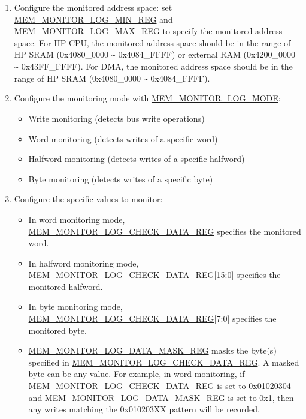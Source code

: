 \documentclass[main\_\_EN.tex]{subfiles}
\begin{document}
\begin{enumerate}
    \item Configure the monitored address space: set \hyperref[regdesc:MEMMONITORLOGMINREG]{MEM\_MONITOR\_LOG\_MIN\_REG} and \hyperref[regdesc:MEMMONITORLOGMAXREG]{MEM\_MONITOR\_LOG\_MAX\_REG} to specify the monitored address space. For HP CPU, the monitored address space should be in the range of HP SRAM (0x4080\_0000 \verb+~+ 0x4084\_FFFF) or external RAM (0x4200\_0000 \verb+~+ 0x43FF\_FFFF). For DMA, the monitored address space should be in the range of HP SRAM (0x4080\_0000 \verb+~+ 0x4084\_FFFF).
    \item Configure the monitoring mode with \hyperref[fielddesc:MEMMONITORLOGMODE]{MEM\_MONITOR\_LOG\_MODE}:
        \begin{itemize}
            \item Write monitoring (detects bus write operations)
            \item Word monitoring (detects writes of a specific word)
            \item Halfword monitoring (detects writes of a specific halfword)
            \item Byte monitoring (detects writes of a specific byte)
        \end{itemize}
    \item Configure the specific values to monitor:
        \begin{itemize}
            \item In word monitoring mode, \hyperref[regdesc:MEMMONITORLOGCHECKDATAREG]{MEM\_MONITOR\_LOG\_CHECK\_DATA\_REG} specifies the monitored word.
            \item In halfword monitoring mode, \hyperref[regdesc:MEMMONITORLOGCHECKDATAREG]{MEM\_MONITOR\_LOG\_CHECK\_DATA\_REG}[15:0] specifies the monitored halfword.
            \item In byte monitoring mode, \hyperref[regdesc:MEMMONITORLOGCHECKDATAREG]{MEM\_MONITOR\_LOG\_CHECK\_DATA\_REG}[7:0] specifies the monitored byte.
            \item \hyperref[regdesc:MEMMONITORLOGDATAMASKREG]{MEM\_MONITOR\_LOG\_DATA\_MASK\_REG} masks the byte(s) specified in \hyperref[regdesc:MEMMONITORLOGCHECKDATAREG]{MEM\_MONITOR\_LOG\_CHECK\_DATA\_REG}. A masked byte can be any value. For example, in word monitoring, if \hyperref[regdesc:MEMMONITORLOGCHECKDATAREG]{MEM\_MONITOR\_LOG\_CHECK\_DATA\_REG} is set to 0x01020304 and \hyperref[regdesc:MEMMONITORLOGDATAMASKREG]{MEM\_MONITOR\_LOG\_DATA\_MASK\_REG} is set to 0x1, then any writes matching the 0x010203XX pattern will be recorded.

\end{itemize}
\end{enumerate}
\end{document}
